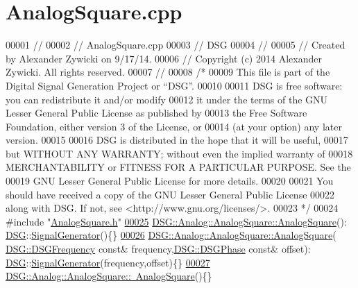 \hypertarget{_analog_square_8cpp_source}{\section{Analog\+Square.\+cpp}
\label{_analog_square_8cpp_source}
}

\begin{DoxyCode}
00001 \textcolor{comment}{//}
00002 \textcolor{comment}{//  AnalogSquare.cpp}
00003 \textcolor{comment}{//  DSG}
00004 \textcolor{comment}{//}
00005 \textcolor{comment}{//  Created by Alexander Zywicki on 9/17/14.}
00006 \textcolor{comment}{//  Copyright (c) 2014 Alexander Zywicki. All rights reserved.}
00007 \textcolor{comment}{//}
00008 \textcolor{comment}{/*}
00009 \textcolor{comment}{ This file is part of the Digital Signal Generation Project or “DSG”.}
00010 \textcolor{comment}{}
00011 \textcolor{comment}{ DSG is free software: you can redistribute it and/or modify}
00012 \textcolor{comment}{ it under the terms of the GNU Lesser General Public License as published by}
00013 \textcolor{comment}{ the Free Software Foundation, either version 3 of the License, or}
00014 \textcolor{comment}{ (at your option) any later version.}
00015 \textcolor{comment}{}
00016 \textcolor{comment}{ DSG is distributed in the hope that it will be useful,}
00017 \textcolor{comment}{ but WITHOUT ANY WARRANTY; without even the implied warranty of}
00018 \textcolor{comment}{ MERCHANTABILITY or FITNESS FOR A PARTICULAR PURPOSE.  See the}
00019 \textcolor{comment}{ GNU Lesser General Public License for more details.}
00020 \textcolor{comment}{}
00021 \textcolor{comment}{ You should have received a copy of the GNU Lesser General Public License}
00022 \textcolor{comment}{ along with DSG.  If not, see <http://www.gnu.org/licenses/>.}
00023 \textcolor{comment}{ */}
00024 \textcolor{preprocessor}{#include "\hyperlink{_analog_square_8h}{AnalogSquare.h}"}
\hypertarget{_analog_square_8cpp_source_l00025}{}\hyperlink{class_d_s_g_1_1_analog_1_1_analog_square_a7425ebd7e39129178eb050a04cd9d5d6}{00025} \hyperlink{class_d_s_g_1_1_analog_1_1_analog_square_a7425ebd7e39129178eb050a04cd9d5d6}{DSG::Analog::AnalogSquare::AnalogSquare}():
      \hyperlink{namespace_d_s_g}{DSG}::\hyperlink{class_d_s_g_1_1_signal_generator}{SignalGenerator}()\{\}
\hypertarget{_analog_square_8cpp_source_l00026}{}\hyperlink{class_d_s_g_1_1_analog_1_1_analog_square_a886eb67edded43efca895741559a55f4}{00026} \hyperlink{class_d_s_g_1_1_analog_1_1_analog_square_a7425ebd7e39129178eb050a04cd9d5d6}{DSG::Analog::AnalogSquare::AnalogSquare}(
      \hyperlink{namespace_d_s_g_a4315a061386fa1014fda09b15d3a6973}{DSG::DSGFrequency} \textcolor{keyword}{const}& frequency,\hyperlink{namespace_d_s_g_a44431ce1eb0a7300efdd207bc879e52c}{DSG::DSGPhase} \textcolor{keyword}{const}& offset):
      \hyperlink{namespace_d_s_g}{DSG}::\hyperlink{class_d_s_g_1_1_signal_generator}{SignalGenerator}(frequency,offset)\{\}
\hypertarget{_analog_square_8cpp_source_l00027}{}\hyperlink{class_d_s_g_1_1_analog_1_1_analog_square_a17b3928f19cb6bf0c151b5e1159de1db}{00027} \hyperlink{class_d_s_g_1_1_analog_1_1_analog_square_a17b3928f19cb6bf0c151b5e1159de1db}{DSG::Analog::AnalogSquare::~AnalogSquare}()\{\}
\end{DoxyCode}
